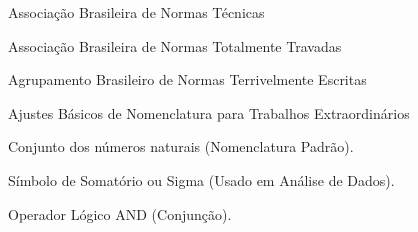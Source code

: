 \documentclass[
	12pt,				%
    oneside,            %
	a4paper,			%
	english,			%
	brazilian,		    %
	]{AcademicoUFT}
\begin{document}
\nocite{*} %
\frenchspacing %


\imprimircapa %
\imprimirfolhaderosto %


\listoffigures*
\cleardoublepage


\listoftables*
\cleardoublepage


\begin{siglas}
    \item[ABNT]  Associação Brasileira de Normas Técnicas
    \item[ABNTT] Associação Brasileira de Normas Totalmente Travadas
    \item[ABNTE] Agrupamento Brasileiro de Normas Terrivelmente Escritas
    \item[ABNTX] Ajustes Básicos de Nomenclatura para Trabalhos Extraordinários
\end{siglas}


\begin{simbolos}
    \item[$ \mathbb{N} $] Conjunto dos números naturais (Nomenclatura Padrão).
    \item[$ \Sigma $] Símbolo de Somatório ou Sigma (Usado em Análise de Dados).
    \item[$ \land $] Operador Lógico AND (Conjunção).
\end{simbolos}
\end{document}
